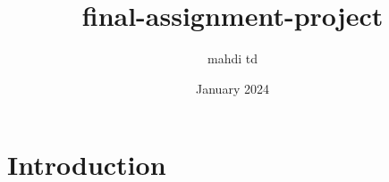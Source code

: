 \documentclass{article}
\title{final-assignment-project}
\author{mahdi td}
\date{January 2024}
\begin{document}
\maketitle

\section{Introduction}
\end{document}
